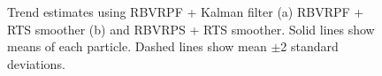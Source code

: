 \documentclass[journal]{IEEEtran}
\begin{document}
\begin{figure}[!t]
\centering
{} \\
 \\
\caption{Trend estimates using RBVRPF + Kalman filter (a) RBVRPF + RTS smoother (b) and RBVRPS + RTS smoother. Solid lines show means of each particle. Dashed lines show mean $\pm$2 standard deviations.}
\label{fig:example_state}
\end{figure}
\end{document}
